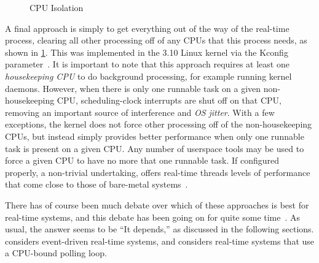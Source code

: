 \begin{figure}
\centering
{}
\caption{CPU Isolation}
\label{fig:advsync:CPU Isolation}
\end{figure}

A final approach is simply to get everything out of the way of the
real-time process, clearing all other processing off of any CPUs that
this process needs, as shown in \cref{fig:advsync:CPU Isolation}.
This was implemented in the 3.10 Linux kernel via the 
Kconfig parameter~\cite{JonCorbet2013NO-HZ-FULL,FredericWeisbecker2013nohz}.
It is important to note that this approach requires at least one
\emph{housekeeping CPU} to do background processing, for example running
kernel daemons.
However, when there is only one runnable task on a given non-housekeeping CPU,
scheduling-clock interrupts are shut off on that CPU, removing an important
source of interference and \emph{OS jitter}.
With a few exceptions, the kernel does not force other processing off of the
non-housekeeping CPUs, but instead simply provides better performance
when only one runnable task is present on a given CPU\@.
Any number of userspace tools may be used to force a given CPU to have
no more that one runnable task.
If configured properly, a non-trivial undertaking, 
offers real-time threads levels of performance that come close to those of
bare-metal systems~\cite{AbdullahAljuhni2018nohzfull}.

There has of course been much debate over which of these approaches
is best for real-time systems, and this debate has been going on for
quite some
time~\cite{JonCorbet2004RealTimeLinuxPart1,JonCorbet2004RealTimeLinuxPart2}.
As usual, the answer seems to be ``It depends,'' as discussed in the
following sections.
considers event-driven real-time systems, and
considers real-time systems that use a CPU-bound polling loop.

